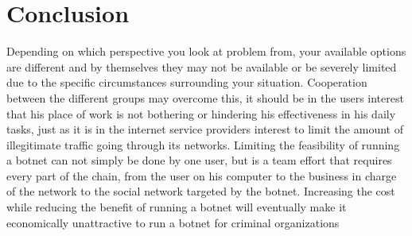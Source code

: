 \section{Conclusion}
Depending on which perspective you look at problem from, your available options are different and by themselves they may not be available or be severely limited due to the specific circumstances surrounding your situation. Cooperation between the different groups may overcome this, it should be in the users interest that his place of work is not bothering or hindering his effectiveness in his daily tasks, just as it is in the internet service providers interest to limit the amount of illegitimate traffic going through its networks. Limiting the feasibility of running a botnet can not simply be done by one user, but is a team effort that requires every part of the chain, from the user on his computer to the business in charge of the network to the social network targeted by the botnet.
Increasing the cost while reducing the benefit of running a botnet will eventually make it economically unattractive to run a botnet for criminal organizations